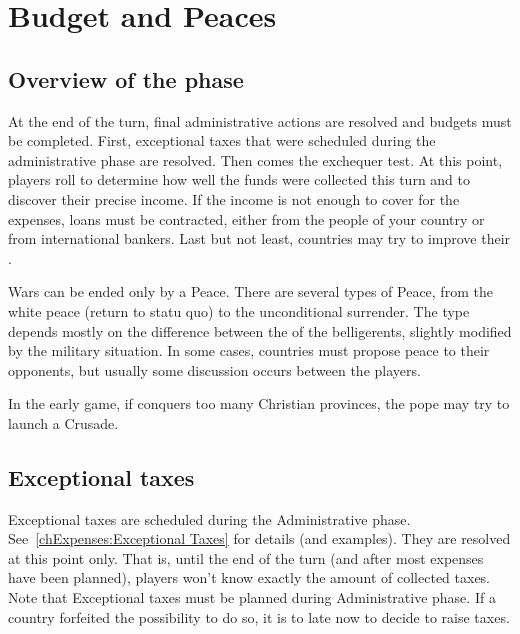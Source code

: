 
\chapter{Budget and Peaces}\label{chapter:Peace}

\section{Overview of the phase}

\aparag[Administration] At the end of the turn, final administrative actions
are resolved and budgets must be completed. First, exceptional taxes that were
scheduled during the administrative phase are resolved. Then comes the
exchequer test. At this point, players roll to determine how well the funds
were collected this turn and to discover their precise income. If the income
is not enough to cover for the expenses, loans must be contracted, either from
the people of your country or from international bankers. Last but not least,
countries may try to improve their \STAB.

\aparag[Peace] Wars can be ended only by a Peace. There are several types of
Peace, from the white peace (return to statu quo) to the unconditional
surrender. The type depends mostly on the difference between the \STAB of the
belligerents, slightly modified by the military situation. In some cases,
countries must propose peace to their opponents, but usually some discussion
occurs between the players.

\aparag[Crusade] In the early game, if \TUR conquers too many Christian
provinces, the pope may try to launch a Crusade.


\PeaceDetails

\section{Exceptional taxes}\label{chPeace:Exceptional taxes}
 Exceptional taxes are scheduled during the
Administrative phase. See~\ref{chExpenses:Exceptional Taxes} for details (and
examples). They are resolved at this point only. That is, until the end of the
turn (and after most expenses have been planned), players won't know exactly
the amount of collected taxes.
\bparag Note that Exceptional taxes must be planned during Administrative
phase. If a country forfeited the possibility to do so, it is to late now to
decide to raise taxes.

